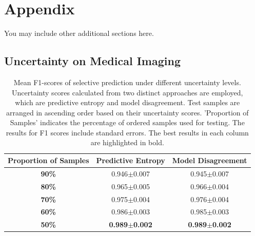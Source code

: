 \documentclass[10pt]{article} %
\begin{document}



\appendix
\section{Appendix}
You may include other additional sections here.
\subsection{Uncertainty on Medical Imaging}
\begin{table}[!htp]
\caption{Mean F1-scores of selective prediction under different uncertainty levels. Uncertainty scores calculated from two distinct approaches are employed, which are predictive entropy and model disagreement. Test samples are arranged in ascending order based on their uncertainty scores. 'Proportion of Samples' indicates the percentage of ordered samples used for testing. The results for F1 scores include standard errors. The best results in each column are highlighted in bold.}
\label{table: VIFA_uncertainty_f1_score}
\begin{center}
\begin{tabular}{c|c|c}
\textbf{Proportion of Samples} & \textbf{Predictive Entropy} & \textbf{Model Disagreement} \\ \hline
\textbf{90\%}                               & 0.946$\pm$0.007                 & 0.945$\pm$0.007                 \\
\textbf{80\%}                               & 0.965$\pm$0.005                 & 0.966$\pm$0.004                 \\
\textbf{70\%}                               & 0.975$\pm$0.004                 & 0.976$\pm$0.004                 \\
\textbf{60\%}                               & 0.986$\pm$0.003                 & 0.985$\pm$0.003                 \\
\textbf{50\%}                               & \textbf{0.989$\pm$0.002}                 & \textbf{0.989$\pm$0.002}                
\end{tabular}
\end{center}
\end{table}
\end{document}
